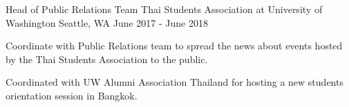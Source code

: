 

\begin{cventries}

  \cventry
    {Head of Public Relations Team} %
    {Thai Students Association at University of Washington} %
    {Seattle, WA} %
    {June 2017 - June 2018} %
    {
      \begin{cvitems} %
        \item {Coordinate with Public Relations team to spread the news about events hosted by the Thai Students Association to the public.}
        \item {Coordinated with UW Alumni Association Thailand for hosting a new students orientation session in Bangkok.}
      \end{cvitems}
    }

\end{cventries}
